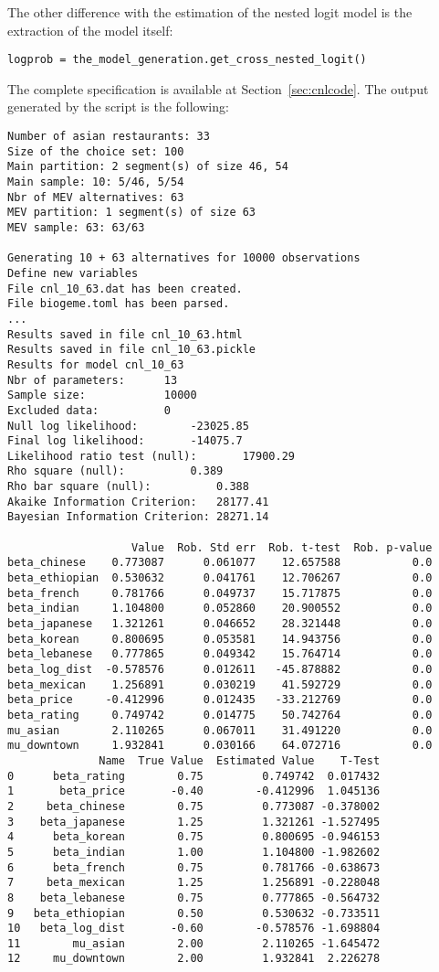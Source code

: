 \documentclass[12pt,a4paper]{article}
\begin{document}
The other difference with the estimation of the nested logit model is the extraction of the model itself:
\begin{lstlisting}
logprob = the_model_generation.get_cross_nested_logit()
\end{lstlisting}
The complete specification is available at Section~\ref{sec:cnlcode}.
The output generated by the script is the following:
\begin{lstlisting}
Number of asian restaurants: 33
Size of the choice set: 100
Main partition: 2 segment(s) of size 46, 54
Main sample: 10: 5/46, 5/54
Nbr of MEV alternatives: 63
MEV partition: 1 segment(s) of size 63
MEV sample: 63: 63/63

Generating 10 + 63 alternatives for 10000 observations
Define new variables
File cnl_10_63.dat has been created.
File biogeme.toml has been parsed.
...
Results saved in file cnl_10_63.html
Results saved in file cnl_10_63.pickle
Results for model cnl_10_63
Nbr of parameters:		13
Sample size:			10000
Excluded data:			0
Null log likelihood:		-23025.85
Final log likelihood:		-14075.7
Likelihood ratio test (null):		17900.29
Rho square (null):			0.389
Rho bar square (null):			0.388
Akaike Information Criterion:	28177.41
Bayesian Information Criterion:	28271.14

                   Value  Rob. Std err  Rob. t-test  Rob. p-value
beta_chinese    0.773087      0.061077    12.657588           0.0
beta_ethiopian  0.530632      0.041761    12.706267           0.0
beta_french     0.781766      0.049737    15.717875           0.0
beta_indian     1.104800      0.052860    20.900552           0.0
beta_japanese   1.321261      0.046652    28.321448           0.0
beta_korean     0.800695      0.053581    14.943756           0.0
beta_lebanese   0.777865      0.049342    15.764714           0.0
beta_log_dist  -0.578576      0.012611   -45.878882           0.0
beta_mexican    1.256891      0.030219    41.592729           0.0
beta_price     -0.412996      0.012435   -33.212769           0.0
beta_rating     0.749742      0.014775    50.742764           0.0
mu_asian        2.110265      0.067011    31.491220           0.0
mu_downtown     1.932841      0.030166    64.072716           0.0
              Name  True Value  Estimated Value    T-Test
0      beta_rating        0.75         0.749742  0.017432
1       beta_price       -0.40        -0.412996  1.045136
2     beta_chinese        0.75         0.773087 -0.378002
3    beta_japanese        1.25         1.321261 -1.527495
4      beta_korean        0.75         0.800695 -0.946153
5      beta_indian        1.00         1.104800 -1.982602
6      beta_french        0.75         0.781766 -0.638673
7     beta_mexican        1.25         1.256891 -0.228048
8    beta_lebanese        0.75         0.777865 -0.564732
9   beta_ethiopian        0.50         0.530632 -0.733511
10   beta_log_dist       -0.60        -0.578576 -1.698804
11        mu_asian        2.00         2.110265 -1.645472
12     mu_downtown        2.00         1.932841  2.226278
\end{lstlisting}
\clearpage
\end{document}
